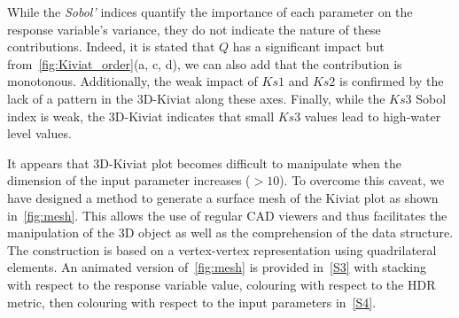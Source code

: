 While the \emph{Sobol'} indices quantify the importance of each parameter on the response variable's variance, they do not indicate the nature of these contributions. Indeed, it is stated that $Q$ has a significant impact but from~\cref{fig:Kiviat_order}(a, c, d), we can also add that the contribution is monotonous. Additionally, the weak impact of $Ks1$ and $Ks2$ is confirmed by the lack of a pattern in the 3D-Kiviat along these axes. Finally, while the $Ks3$ Sobol index is weak, the 3D-Kiviat indicates that small $Ks3$ values lead to high-water level values.

It appears that 3D-Kiviat plot becomes difficult to manipulate when the dimension of the input parameter increases ($>10$). To overcome this caveat, we have designed a method to generate a surface mesh of the Kiviat plot as shown in~\cref{fig:mesh}. This allows the use of regular CAD viewers and thus facilitates the manipulation of the 3D object as well as the comprehension of the data structure. The construction is based on a vertex-vertex representation using quadrilateral elements. An animated version of~\cref{fig:mesh} is provided in~\cref{S3} with stacking with respect to the response variable value, colouring with respect to the HDR metric, then colouring with respect to the input parameters in~\cref{S4}. 


